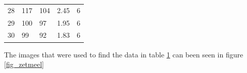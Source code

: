 \begin{table}[h!]
\begin{tabular}{|l|l|l|l|l|}
28              & 117                & 104                & 2.45                           & 6                                 \\
29              & 100                & 97                 & 1.95                           & 6                                 \\
30              & 99                 & 92                 & 1.83                           & 6\\ \hline
\end{tabular}
\label{table_zetmeel}
\end{table}

\newpage

The images that were used to find the data in table \ref{table_zetmeel} can been seen in figure \ref{fig_zetmeel}

\begin{figure}[h!]
	

\end{figure}
